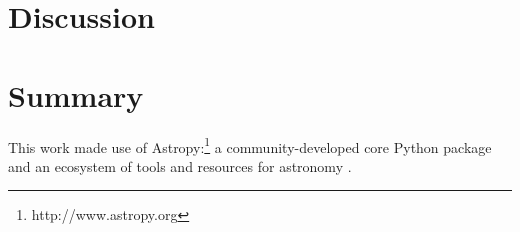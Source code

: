 \documentclass[preprint]{aastex631}
\begin{document}
\section{Discussion} \label{sec:discussion}




\section{Summary} \label{sec:summary}


\vspace{10ex}

This work made use of Astropy:\footnote{http://www.astropy.org} a community-developed core Python package and an ecosystem of tools and resources for astronomy \citep{astropy:2013, astropy:2018, astropy:2022}.



  



{}



\end{document}

